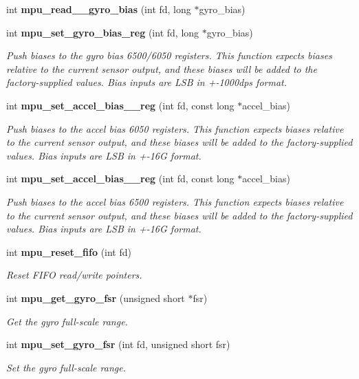 \begin{DoxyCompactItemize}
int \textbf{ mpu\+\_\+read\+\_\+\_\+gyro\+\_\+bias} (int fd, long $\ast$gyro\+\_\+bias)
\item 
int \textbf{ mpu\+\_\+set\+\_\+gyro\+\_\+bias\+\_\+reg} (int fd, long $\ast$gyro\+\_\+bias)
\begin{DoxyCompactList}\small\item\em Push biases to the gyro bias 6500/6050 registers. This function expects biases relative to the current sensor output, and these biases will be added to the factory-\/supplied values. Bias inputs are L\+SB in +-\/1000dps format. \end{DoxyCompactList}\item 
int \textbf{ mpu\+\_\+set\+\_\+accel\+\_\+bias\+\_\+\_\+reg} (int fd, const long $\ast$accel\+\_\+bias)
\begin{DoxyCompactList}\small\item\em Push biases to the accel bias 6050 registers. This function expects biases relative to the current sensor output, and these biases will be added to the factory-\/supplied values. Bias inputs are L\+SB in +-\/16G format. \end{DoxyCompactList}\item 
int \textbf{ mpu\+\_\+set\+\_\+accel\+\_\+bias\+\_\+\_\+reg} (int fd, const long $\ast$accel\+\_\+bias)
\begin{DoxyCompactList}\small\item\em Push biases to the accel bias 6500 registers. This function expects biases relative to the current sensor output, and these biases will be added to the factory-\/supplied values. Bias inputs are L\+SB in +-\/16G format. \end{DoxyCompactList}\item 
int \textbf{ mpu\+\_\+reset\+\_\+fifo} (int fd)
\begin{DoxyCompactList}\small\item\em Reset F\+I\+FO read/write pointers. \end{DoxyCompactList}\item 
int \textbf{ mpu\+\_\+get\+\_\+gyro\+\_\+fsr} (unsigned short $\ast$fsr)
\begin{DoxyCompactList}\small\item\em Get the gyro full-\/scale range. \end{DoxyCompactList}\item 
int \textbf{ mpu\+\_\+set\+\_\+gyro\+\_\+fsr} (int fd, unsigned short fsr)
\begin{DoxyCompactList}\small\item\em Set the gyro full-\/scale range. \end{DoxyCompactList}\item 

\end{DoxyCompactItemize}
